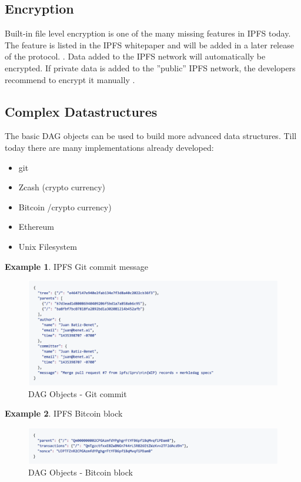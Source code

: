 \documentclass[a4paper,11pt, oneside]{report}
\theoremstyle{definition}
\newtheorem{exmp}{Example}[subsection]
\begin{document}
\subsection{Encryption}
Built-in file level encryption is one of the many missing features in IPFS today. The feature is listed in the IPFS whitepaper and will be added in a later release of the protocol. \cite{Encryption}. Data added to the IPFS network will automatically be encrypted. If private data is added to the ''public'' IPFS network, the developers recommend to encrypt it manually \cite{EncryptionManual}.


\newpage
\subsection{Complex Datastructures}
The basic DAG objects can be used to build more advanced data structures. Till today there are many implementations already developed:
\begin{itemize}
\item git
\item Zcash (crypto currency)
\item Bitcoin /crypto currency)
\item Ethereum
\item Unix Filesystem
\end{itemize}

\begin{exmp}IPFS Git commit message
\begin{figure}[H]
\centering
\includegraphics[width=\textwidth]{img/dag-object-gitcommit.png}
\caption[DAG Objects commit]{DAG Objects - Git commit}
\end{figure}
\end{exmp}
\begin{exmp}IPFS Bitcoin block
\begin{figure}[H]
\centering
\includegraphics[width=\textwidth]{img/dag-object-blockchain.png}
\caption[DAG Bitcoin block]{DAG Objects - Bitcoin block}
\end{figure}
\end{exmp}
\end{document}
